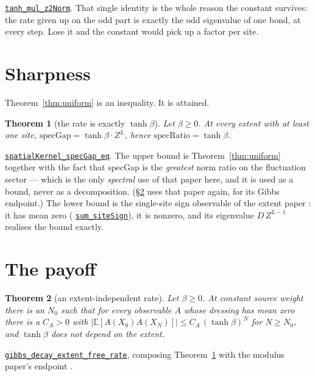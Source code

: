 \documentclass[11pt]{article}
\newtheorem{theorem}{Theorem}[section]
\theoremstyle{definition}
\newcommand{\anchor}{247de2b31c8b2b6edb2cffe5fd6d96d6aa5c8a7a}
\newcommand{\osline}[3]{%
  \href{https://github.com/lluiseriksson/THE-ERIKSSON-PROGRAMME/blob/\anchor/YangMills/OS/#1.lean\#L#2}{\nolinkurl{#3}}}
\begin{document}
\osline{SpatialUniform}{199}{tanh\_mul\_z2Norm}.
That single identity is the whole reason the constant survives: the rate given
up on the odd part is exactly the odd eigenvalue of one bond, at every step.
Lose it and the constant would pick up a factor per site.

\section{Sharpness}\label{sec:sharp}

Theorem~\ref{thm:uniform} is an inequality.  It is attained.

\begin{theorem}[the rate is exactly $\tanh\beta$]\label{thm:sharp}
Let $\beta\ge0$.  At every extent with at least one site,
$\mathrm{specGap} = \tanh\beta \cdot Z^{L}$, hence
$\mathrm{specRatio} = \tanh\beta$.
\end{theorem}

\osline{SpatialUniform}{436}{spatialKernel\_specGap\_eq}.
The upper bound is Theorem~\ref{thm:uniform} together with the fact that
$\mathrm{specGap}$ is the \emph{greatest} norm ratio on the fluctuation sector
\cite{ErikssonSpectral} --- which is the only \emph{spectral} use of that paper
here, and it is used as a bound, never as a decomposition.  (\S\ref{sec:payoff}
uses that paper again, for its Gibbs endpoint.)  The lower bound is the
single-site sign observable of the extent paper \cite{ErikssonExtent}: it has
mean zero (\osline{SpatialUniform}{408}{sum\_siteSign}), it is nonzero, and
its eigenvalue $D\,Z^{L-1}$ realises the bound exactly.

\section{The payoff}\label{sec:payoff}

\begin{theorem}[an extent-independent rate]\label{thm:ratefree}
Let $\beta\ge0$.  At constant source weight there is an $N_0$ such that for every
observable $A$ whose dressing has mean zero there is a $C_A>0$ with
$\bigl|\mathbb{E}[A(X_0)A(X_N)]\bigr| \le C_A\,(\tanh\beta)^{N}$ for $N \ge N_0$,
and $\tanh\beta$ does not depend on the extent.
\end{theorem}

\osline{SpatialUniform}{532}{gibbs\_decay\_extent\_free\_rate}, composing
Theorem~\ref{thm:sharp} with the modulus paper's endpoint
\cite{ErikssonSpectral}.
\end{document}
